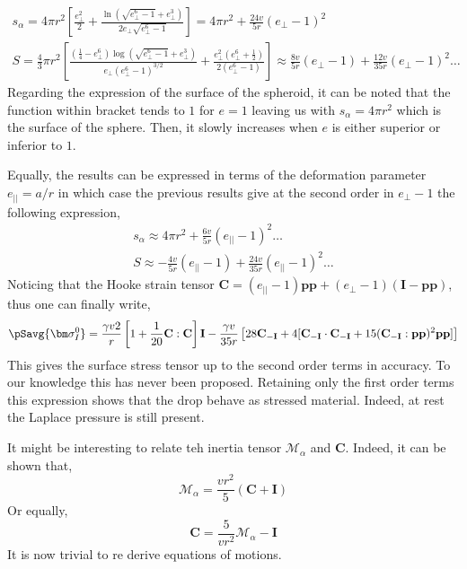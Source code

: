 \begin{align*}
    s_\alpha 
    = 4\pi r^2 \left[\frac{e_\bot^2}{2} + \frac{\ln\left(\sqrt{{e_\bot^6}-1}+{e_\bot^3}\right)}{2e_\bot\sqrt{e_\bot^6-1}}\right]
    = 4 \pi r^2 + \frac{24 v }{5 r} (e_\bot-1)^2\\
    S = \frac{4}{3} \pi r^2 \left[
    \frac{\left( \frac{1}{4} - e_\bot^6\right)  \log{\left( \sqrt{e_\bot^6-1}+{e_\bot^3}\right) } }
    { e_\bot  \left( e_\bot^6- 1\right)^{3/2} }
    +  \frac{e_\bot^2\left( e_\bot^6+  \frac{1}{2}\right)}{2\left( e_\bot^6- 1\right)}  \right]
    \approx 
    \frac{8 v}{5 r}(e_\bot-1) + \frac{12 v }{35r}(e_\bot-1)^2 \ldots
\end{align*}
Regarding the expression of the surface of the spheroid, it can be noted that the function within bracket tends to $1$ for $e=1$ leaving us with $s_\alpha = 4\pi r^2$ which is the surface of the sphere. 
Then, it slowly increases when $e$ is either superior or inferior to $1$. 

Equally, the results can be expressed in terms of the deformation parameter $e_{||} = a/r$ in which case the previous results give at the second order in $e_\bot-1$ the following expression, 
\begin{align*}
    s_\alpha 
    \approx 4 \pi r^2 + \frac{6 v }{5 r} (e_{||}-1)^2 \ldots\\
    S 
    \approx 
    - \frac{4 v}{5 r}(e_{||}-1) + \frac{24 v }{35r}(e_{||}-1)^2 \ldots
\end{align*}
Noticing that the Hooke strain tensor $\textbf{C} = (e_{||}-1) \textbf{pp} + (e_\bot-1)(\textbf{I}- \textbf{pp})$, thus one can finally write,
\begin{align*}
    \pSavg{\bm\sigma_I^0}
    = \frac{\gamma v 2}{r} \left[
        1  + \frac{1}{20 }\textbf{C}:\textbf{C}\right] \textbf{I}
        - \frac{\gamma v}{35 r} \left[ 28 \textbf{C}_{-\textbf{I}}
        + 4[\textbf{C}_{-\textbf{I}}\cdot \textbf{C}_{-\textbf{I}} + 15 (\textbf{C}_{-\textbf{I}}:\textbf{pp})^2\textbf{pp}]
        \right]
\end{align*}
This gives the surface stress tensor up to the second order terms in accuracy. 
To our knowledge this has never been proposed. 
Retaining only the first order terms this expression shows that the drop behave as stressed material. 
Indeed, at rest the Laplace pressure is still present. 

It might be interesting to relate teh inertia tensor $\mathcal{M}_\alpha$ and \textbf{C}. 
Indeed, it can be shown that, 
\begin{equation}
    \mathcal{M}_\alpha
     = \frac{v r^2}{5}\left(\textbf{C} + \textbf{I}\right)
\end{equation}
Or equally, 
\begin{equation}
    \textbf{C}
     = \frac{5}{vr^2}\mathcal{M}_\alpha - \textbf{I}
\end{equation}
It is now trivial to re derive \citet{goddard1967nonlinear} equations of motions. 


